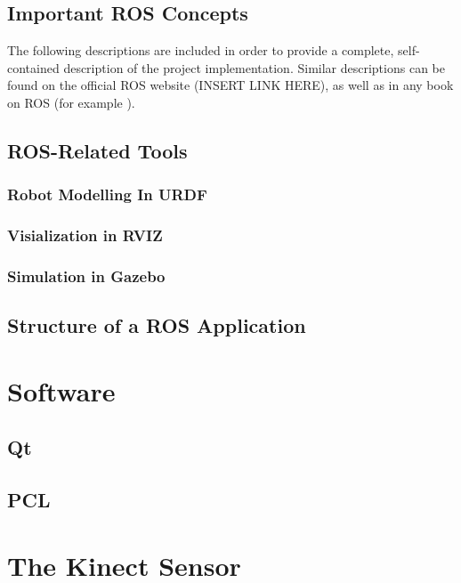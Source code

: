 \subsection{Important ROS Concepts}

The following descriptions are included in order to provide a complete, self-contained description of the project implementation. Similar descriptions can be found on the official \ac{ROS} website (INSERT LINK HERE), as well as in any book on \ac{ROS} (for example \cite{A BOOK ON ROS}). 

\subsection{ROS-Related Tools}

\subsubsection{Robot Modelling In URDF}

\subsubsection{Visialization in RVIZ}

\subsubsection{Simulation in Gazebo}

\subsection{Structure of a ROS Application}

\section{Software}

\subsection{Qt}

\subsection{PCL}

\section{The Kinect Sensor}

